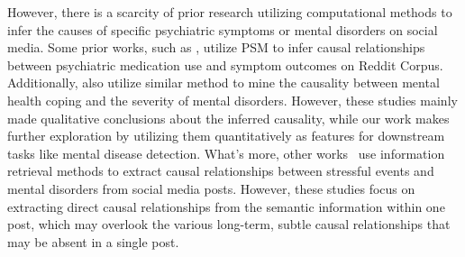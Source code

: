 However, there is a scarcity of prior research utilizing computational methods to infer the causes of specific psychiatric symptoms or mental disorders on social media. 
Some prior works, such as \citet{Saha2019social}, utilize PSM to infer causal relationships between psychiatric medication use and symptom outcomes on Reddit Corpus. Additionally, \citet{Yuan2023Mental} also utilize similar method to mine the causality between mental health coping and the severity of mental disorders. However, these studies mainly made qualitative conclusions about the inferred causality, while our work makes further exploration by utilizing them quantitatively as features for downstream tasks like mental disease detection.
What's more, other works~\cite{garg2022cams, Saxena2023Explainable} use information retrieval methods to extract causal relationships between stressful events and mental disorders from social media posts. However, these studies focus on extracting direct causal relationships from the semantic information within one post, which may overlook the various long-term, subtle causal relationships that may be absent in a single post.



